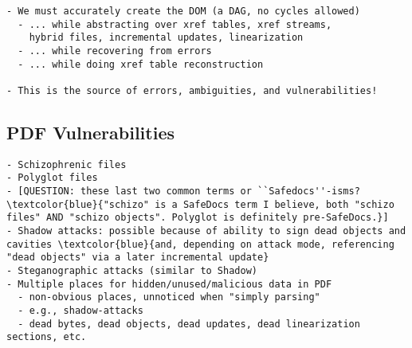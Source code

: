 \begin{lstlisting}[style=meta]
- We must accurately create the DOM (a DAG, no cycles allowed)
  - ... while abstracting over xref tables, xref streams,
    hybrid files, incremental updates, linearization
  - ... while recovering from errors
  - ... while doing xref table reconstruction

- This is the source of errors, ambiguities, and vulnerabilities!
\end{lstlisting}

\subsection{PDF Vulnerabilities}
\label{sec:pdf-vulnerabilities}

\begin{lstlisting}[style=meta]
- Schizophrenic files
- Polyglot files
- [QUESTION: these last two common terms or ``Safedocs''-isms? \textcolor{blue}{"schizo" is a SafeDocs term I believe, both "schizo files" AND "schizo objects". Polyglot is definitely pre-SafeDocs.}]
- Shadow attacks: possible because of ability to sign dead objects and cavities \textcolor{blue}{and, depending on attack mode, referencing "dead objects" via a later incremental update} 
- Steganographic attacks (similar to Shadow)
- Multiple places for hidden/unused/malicious data in PDF
  - non-obvious places, unnoticed when "simply parsing"
  - e.g., shadow-attacks
  - dead bytes, dead objects, dead updates, dead linearization sections, etc.
\end{lstlisting}


